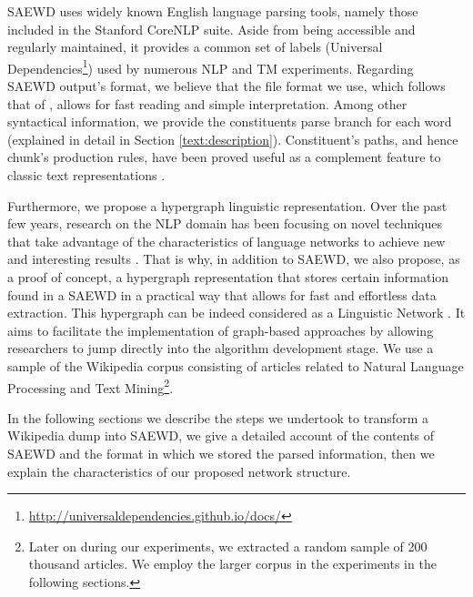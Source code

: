 SAEWD uses widely known English language parsing tools, namely those included in the Stanford CoreNLP suite.  Aside from being accessible and regularly maintained, it provides a common set of labels (Universal Dependencies\footnote{\url{http://universaldependencies.github.io/docs/}}) used by numerous NLP and TM experiments. Regarding SAEWD output's format, we believe that the file format we use, which follows  that of \cite{ATSERIAS08}, allows for fast reading and simple interpretation. Among other syntactical information, we provide the constituents parse branch for each word (explained in detail in Section \ref{text:description}). 
Constituent's paths, and hence chunk's production rules, have been proved useful as a complement feature to classic text representations \cite{sagae2009,Bergsma2012,Massung2013}. 

Furthermore, we propose a hypergraph linguistic representation. Over the past few years, research on the NLP domain has been focusing on novel techniques that take advantage of the characteristics of language networks to achieve new and interesting results \cite{Mihalcea2011}. That is why, in addition to SAEWD, we also propose, as a proof of concept, a hypergraph representation that stores certain information found in a SAEWD in a practical way that allows for fast and effortless data extraction. This hypergraph can be indeed considered as a Linguistic Network \cite{Choudhury09}.  It aims to facilitate the implementation of graph-based approaches by allowing researchers to jump directly into the algorithm development stage. We use a sample of the Wikipedia corpus consisting of articles related to Natural Language Processing and Text Mining\footnote{Later on during our experiments, we extracted a random sample of  200 thousand articles. We employ the larger corpus in the experiments in the following sections.}. 

In the following sections we describe the steps we undertook to transform a Wikipedia dump into SAEWD, we give a detailed account of the contents of SAEWD and the format in which we stored the parsed information, then we explain the characteristics of our proposed network structure. %





